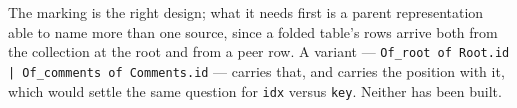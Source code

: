 \documentclass[11pt,a4paper]{article}
\begin{document}
\begin{enumerate}
        The marking is the right design; what it needs first is a parent
        representation able to name more than one source, since a folded
        table's rows arrive both from the collection at the root and from a
        peer row. A variant --- \texttt{Of\_root of Root.id | Of\_comments of
        Comments.id} --- carries that, and carries the position with it, which
        would settle the same question for \texttt{idx} versus \texttt{key}.
        Neither has been built.
\end{enumerate}
\end{document}

